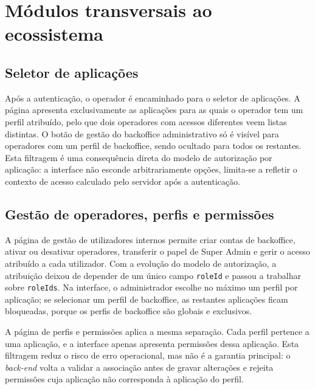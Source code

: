 
\section{Módulos transversais ao ecossistema}
\label{sec:modulos_transversais}

\subsection{Seletor de aplicações}
\label{subsec:impl_app_selector}

Após a autenticação, o operador é encaminhado para o seletor de aplicações. A página apresenta exclusivamente as aplicações para as quais o operador tem um perfil atribuído, pelo que dois operadores com acessos diferentes veem listas distintas. O botão de gestão do backoffice administrativo só é visível para operadores com um perfil de backoffice, sendo ocultado para todos os restantes. Esta filtragem é uma consequência direta do modelo de autorização por aplicação: a interface não esconde arbitrariamente opções, limita-se a refletir o contexto de acesso calculado pelo servidor após a autenticação.

\subsection{Gestão de operadores, perfis e permissões}
\label{subsec:impl_roles_permissions}

A página de gestão de utilizadores internos permite criar contas de backoffice, ativar ou desativar operadores, transferir o papel de Super Admin e gerir o acesso atribuído a cada utilizador. Com a evolução do modelo de autorização, a atribuição deixou de depender de um único campo \texttt{roleId} e passou a trabalhar sobre \texttt{roleIds}. Na interface, o administrador escolhe no máximo um perfil por aplicação; se selecionar um perfil de backoffice, as restantes aplicações ficam bloqueadas, porque os perfis de backoffice são globais e exclusivos.

A página de perfis e permissões aplica a mesma separação. Cada perfil pertence a uma aplicação, e a interface apenas apresenta permissões dessa aplicação. Esta filtragem reduz o risco de erro operacional, mas não é a garantia principal: o \textit{back-end} volta a validar a associação antes de gravar alterações e rejeita permissões cuja aplicação não corresponda à aplicação do perfil.

